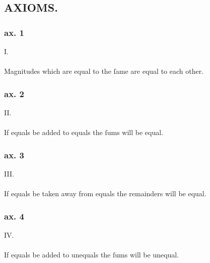 \begin{minipage}{0.33\textwidth}
    \phantom{}
\end{minipage}%
\begin{minipage}{0.67\textwidth}
    \subsection[Axioms]{\centering \scshape{\LARGE{AXIOMS.}}}
    \label{subsec:axioms}

    \hfill

    \subsubsection{ax. 1}
    \begin{center}
        I.\label{ax1}\\
        \hfill\\
        Magnitudes which are equal to the ſame are equal to each other.\\
    \end{center}
    \subsubsection{ax. 2}
    \begin{center}
        II.\label{ax2}\\
        \hfill\\
        If equals be added to equals the ſums will be equal.\\
    \end{center}
    \subsubsection{ax. 3}
    \begin{center}
        III.\label{ax3}\\
        \hfill\\
        If equals be taken away from equals the remainders will be equal.\\
    \end{center}
    \subsubsection{ax. 4}
    \begin{center}
        IV.\label{ax4}\\
        \hfill\\
        If equals be added to unequals the ſums will be unequal.\\
    \end{center}

\end{minipage}
